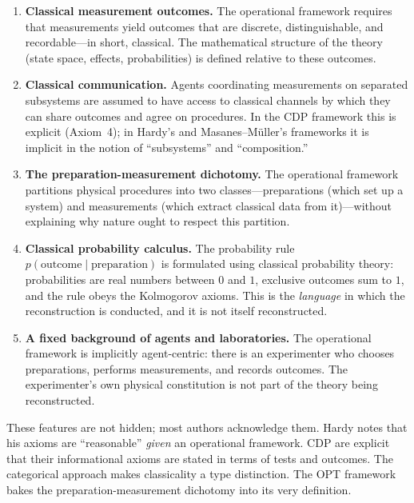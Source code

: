 \documentclass[12pt,a4paper,twoside]{article}
\begin{document}
\begin{enumerate}
\item \textbf{Classical measurement outcomes.} The operational framework requires that measurements yield outcomes that are discrete, distinguishable, and recordable---in short, classical. The mathematical structure of the theory (state space, effects, probabilities) is defined relative to these outcomes.

\item \textbf{Classical communication.} Agents coordinating measurements on separated subsystems are assumed to have access to classical channels by which they can share outcomes and agree on procedures. In the CDP framework this is explicit (Axiom~4); in Hardy's and Masanes--M\"{u}ller's frameworks it is implicit in the notion of ``subsystems'' and ``composition.''

\item \textbf{The preparation-measurement dichotomy.} The operational framework partitions physical procedures into two classes---preparations (which set up a system) and measurements (which extract classical data from it)---without explaining why nature ought to respect this partition.

\item \textbf{Classical probability calculus.} The probability rule $p(\text{outcome} \mid \text{preparation})$ is formulated using classical probability theory: probabilities are real numbers between $0$ and $1$, exclusive outcomes sum to $1$, and the rule obeys the Kolmogorov axioms. This is the \emph{language} in which the reconstruction is conducted, and it is not itself reconstructed.

\item \textbf{A fixed background of agents and laboratories.} The operational framework is implicitly agent-centric: there is an experimenter who chooses preparations, performs measurements, and records outcomes. The experimenter's own physical constitution is not part of the theory being reconstructed.
\end{enumerate}

These features are not hidden; most authors acknowledge them. Hardy \cite{Hardy2001} notes that his axioms are ``reasonable'' \emph{given} an operational framework. CDP \cite{Chiribella2011} are explicit that their informational axioms are stated in terms of tests and outcomes. The categorical approach makes classicality a type distinction. The OPT framework bakes the preparation-measurement dichotomy into its very definition.
\end{document}
